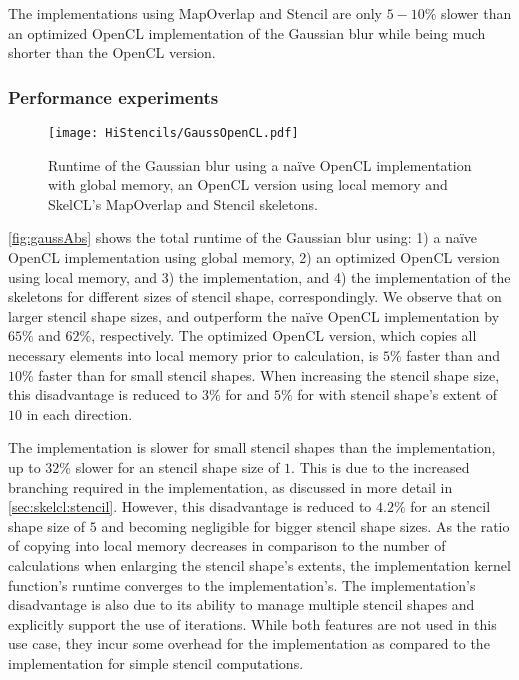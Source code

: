 The implementations using MapOverlap and Stencil are only $5-10\%$ slower than an optimized OpenCL implementation of the Gaussian blur while being much shorter than the OpenCL version.

\subsubsection*{Performance experiments}

\begin{figure}[tbp]
	\centering
	\texttt{[image: HiStencils/GaussOpenCL.pdf]}
	\caption{Runtime of the Gaussian blur using a na{\"i}ve OpenCL implementation with global memory, an OpenCL version using local memory and SkelCL's MapOverlap and Stencil skeletons.}
	\label{fig:gaussAbs}
\end{figure} 

\autoref{fig:gaussAbs} shows the total runtime of the Gaussian blur using:
1) a na{\"i}ve OpenCL implementation using global memory,
2) an optimized OpenCL version using local memory, and
3) the  implementation, and
4) the  implementation of the \stencil skeletons for different sizes of stencil shape, correspondingly.
We observe that on larger stencil shape sizes,  and  outperform the na{\"i}ve OpenCL implementation by $65\%$ and $62\%$, respectively.
The optimized OpenCL version, which copies all necessary elements into local memory prior to calculation, is $5\%$ faster than  and $10\%$ faster than  for small stencil shapes.
When increasing the stencil shape size, this disadvantage is reduced to $3\%$ for  and $5\%$ for  with stencil shape's extent of $10$ in each direction.

The  implementation is slower for small stencil shapes than the  implementation, up to $32\%$ slower for an stencil shape size of $1$.
This is due to the increased branching required in the  implementation, as discussed in more detail in \autoref{sec:skelcl:stencil}.
However, this disadvantage is reduced to $4.2\%$ for an stencil shape size of $5$ and becoming negligible for bigger stencil shape sizes.
As the ratio of copying into local memory decreases in comparison to the number of calculations when enlarging the stencil shape's extents, the  implementation kernel function's runtime converges to the  implementation's.
The  implementation's disadvantage is also due to its ability to manage multiple stencil shapes and explicitly support the use of iterations.
While both features are not used in this use case, they incur some overhead for the implementation as compared to the  implementation for simple stencil computations.


